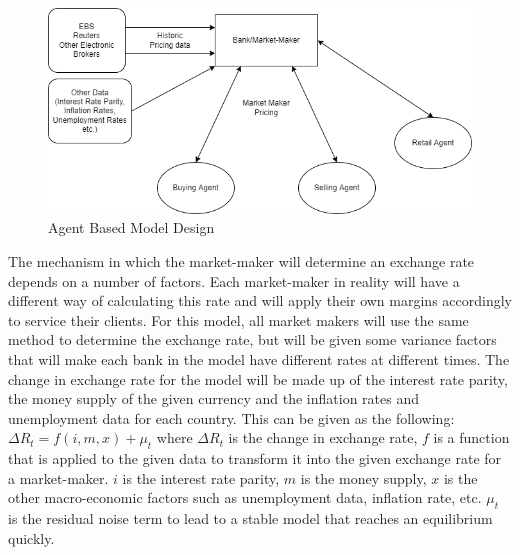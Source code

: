 \begin{figure}[h]
  \includegraphics[scale=0.6]{model_architecture.png}
  \caption{Agent Based Model Design}
  \label{fig:model}
\end{figure}


The mechanism in which the market-maker will determine an exchange rate depends on a number of factors. Each market-maker in reality will have a different way of calculating this rate and will apply their own margins accordingly to service their clients. For this model, all market makers will use the same method to determine the exchange rate, but will be given some variance factors that will make each bank in the model have different rates at different times. The change in exchange rate for the model will be made up of the interest rate parity, the money supply of the given currency and the inflation rates and unemployment data for each country. This can be given as the following: $\Delta R_t = f(i, m, x) + \mu _t$ where $\Delta R_t$ is the change in exchange rate, $f$ is a function that is applied to the given data to transform it into the given exchange rate for a market-maker. $i$ is the interest rate parity, $m$ is the money supply, $x$ is the other macro-economic factors such as unemployment data, inflation rate, etc. $\mu _t$ is the residual noise term to lead to a stable model that reaches an equilibrium quickly. \cite{delage2011multi}


